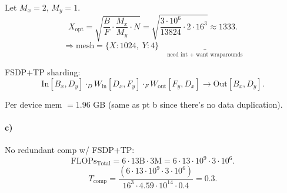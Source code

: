 \documentclass[11pt]{article}
\newcommand{\flops}{\text{FLOPs}}
\newcommand{\Tcomp}{T_{\text{comp}}}
\begin{document}
Let $M_x = 2$, $M_y = 1$.
\[
X_{\text{opt}} = \sqrt{\frac{B}{F} \cdot \frac{M_x}{M_y} \cdot N} = \sqrt{\frac{3 \cdot 10^6}{13824} \cdot 2 \cdot 16^3} \approx 1333.
\]
\[
\Rightarrow \text{mesh} = \{X{:}1024,\; Y{:}4\} \quad \underbrace{}_{\text{need int + want wraparounds}}
\]

FSDP$+$TP sharding:
\[
\text{In}[B_x, D_y] \cdot_D W_{\text{in}}[D_x, F_y] \cdot_F W_{\text{out}}[F_y, D_x] \to \text{Out}[B_x, D_y].
\]

Per device mem $= 1.96$ GB \quad (same as pt b since there's no data duplication).

\paragraph{c)} No redundant comp w/ FSDP$+$TP:
\[
\flops_{\text{Total}} = 6 \cdot 13\text{B} \cdot 3\text{M} = 6 \cdot 13 \cdot 10^9 \cdot 3 \cdot 10^6.
\]
\[
\Tcomp = \frac{(6 \cdot 13 \cdot 10^9 \cdot 3 \cdot 10^6)}{16^3 \cdot 4.59 \cdot 10^{14} \cdot 0.4} = 0.3.
\]
\end{document}
